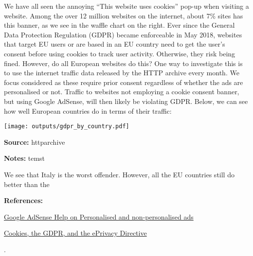 \documentclass[border=0mm]{article}
\begin{document}
\begin{minipage}{0.5\textwidth}
\normalsize
We have all seen the annoying ``This website uses cookies'' pop-up when visiting a website.
Among the over 12 million websites on the internet, about 7\% sites has this banner, as we
see in the waffle chart on the right. Ever since the General Data Protection Regulation (GDPR)
became enforceable in May 2018, websites that target EU users or are based in an EU country
need to get the user's consent before using cookies to track user activity. Otherwise, they
risk being fined. However, do all European websites do this? One way to investigate this is to
use the internet traffic data released by the HTTP archive every month. We focus
considered as these require prior consent regardless of whether the ads are personalised or not.
Traffic to websites not employing a cookie consent banner, but using Google AdSense, will then
likely be violating GDPR. Below, we can see how well European countries do in terms of their
traffic:

\texttt{[image: outputs/gdpr\_by\_country.pdf]}

\textbf{Source:} httparchive

\textbf{Notes:} temst

We see that Italy is the worst offender. However, all the EU countries still do better than
the

\textbf{References:}

\href{https://support.google.com/adsense/answer/9007336}{\color{dark} Google AdSense Help on Personalised and non-personalised ads}

\href{https://gdpr.eu/cookies/}{\color{dark} Cookies, the GDPR, and the ePrivacy Directive}



\end{minipage}%
\begin{minipage}{0.05\textwidth}
    \ssmall.
    \\~\\~\\~\\~\\~\\~\\~\\~\\~\\~\\~\\~\\~\\~\\~\\~\\~\\~\\~\\~\\~\\~\\~\\
\end{minipage}
\end{document}
